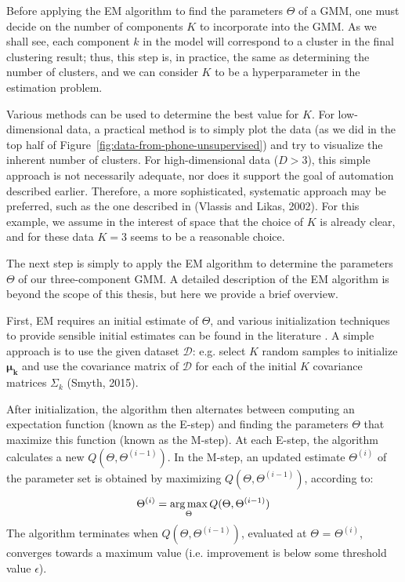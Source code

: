 Before applying the EM algorithm to find the parameters $\Theta$ of a GMM, one must decide on the number of components $K$ to incorporate into the GMM. As we shall see, each component $k$ in the model will correspond to a cluster in the final clustering result; thus, this step is, in practice, the same as determining the number of clusters, and we can consider $K$ to be a hyperparameter in the estimation problem.

Various methods can be used to determine the best value for $K$. For low-dimensional data, a practical method is to simply plot the data (as we did in the top half of Figure~\ref{fig:data-from-phone-unsupervised}) and try to visualize the inherent number of clusters. For high-dimensional data ($D>3$), this simple approach is not necessarily adequate, nor does it support the goal of automation described earlier. Therefore, a more sophisticated, systematic approach may be preferred, such as the one described in (Vlassis and Likas, 2002). For this example, we assume in the interest of space that the choice of $K$ is already clear, and for these data $K=3$ seems to be a reasonable choice.

The next step is simply to apply the EM algorithm to determine the parameters $\Theta$ of our three-component GMM. A detailed description of the EM algorithm is beyond the scope of this thesis, but here we provide a brief overview.

First, EM requires an initial estimate of $\Theta$, and various initialization techniques to provide sensible initial estimates can be found in the literature . A simple approach is to use the given dataset $\mathcal{D}$: e.g. select $K$ random samples to initialize $\boldsymbol{\mu_k}$ and use the covariance matrix of $\mathcal{D}$ for each of the initial $K$ covariance matrices $\Sigma_k$ (Smyth, 2015).

After initialization, the algorithm then alternates between computing an expectation function (known as the E-step) and finding the parameters $\Theta$ that maximize this function (known as the M-step). At each E-step, the algorithm calculates a new $Q(\Theta,\Theta^{(i-1)})$. In the M-step, an updated estimate $\Theta^{(i)}$ of the parameter set is obtained by maximizing $Q(\Theta,\Theta^{(i-1)})$, according to:
%
\begin{equation}
 \Theta^{(i)} = \operatorname*{arg\,max}_\Theta{Q(\Theta,\Theta^{(i-1)})}
\end{equation}
%
The algorithm terminates when $Q(\Theta,\Theta^{(i-1)})$, evaluated at $\Theta$ = $\Theta^{(i)}$, converges towards a maximum value (i.e. improvement is below some threshold value $\epsilon$).

